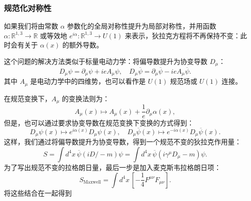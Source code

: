 \subsubsection{规范化对称性} 
如果我们将由常数 \( \alpha \) 参数化的全局对称性提升为局部对称性，并用函数 \( \alpha : \mathbb{R}^{1,3} \to \mathbb{R} \) 或等效地 \( e^{i\alpha} : \mathbb{R}^{1,3} \to U(1) \) 来表示，狄拉克方程将不再保持不变：此时会有关于 \( \alpha(x) \) 的额外导数。

这个问题的解决方法类似于标量电动力学：将偏导数提升为协变导数 \( D_{\mu} \)：
\[
D_{\mu} \psi = \partial_{\mu} \psi + ieA_{\mu} \psi, \quad D_{\mu} \overline{\psi} = \partial_{\mu} \overline{\psi} - ieA_{\mu} \overline{\psi}.~
\]
其中 \( A_{\mu} \) 是电动力学中的四维势，也可以看作是 \( U(1) \) 规范场或 \( U(1) \) 连接。

在规范变换下，\( A_{\mu} \) 的变换法则为：
\[
A_{\mu}(x) \mapsto A_{\mu}(x) + \frac{1}{e} \partial_{\mu} \alpha(x),~
\]
但是，也可以通过要求协变导数在规范变换下变换的方式得到：
\[
D_{\mu} \psi(x) \mapsto e^{i\alpha(x)} D_{\mu} \psi(x), \quad D_{\mu} \overline{\psi}(x) \mapsto e^{-i\alpha(x)} D_{\mu} \overline{\psi}(x).~
\]
这样，我们通过将偏导数提升为协变导数，得到一个规范不变的狄拉克作用量：
\[
S = \int d^4x \, \overline{\psi} \left( i D\!\!\!\!\big/ - m \right) \psi = \int d^4x \, \overline{\psi} \left( i \gamma^{\mu} D_{\mu} - m \right) \psi.~
\]
为了写出规范不变的拉格朗日量，最后一步是加入麦克斯韦拉格朗日项：
\[
S_{\text{Maxwell}} = \int d^4x \, \left[ -\frac{1}{4} F^{\mu \nu} F_{\mu \nu} \right].~
\]
将这些结合在一起得到

